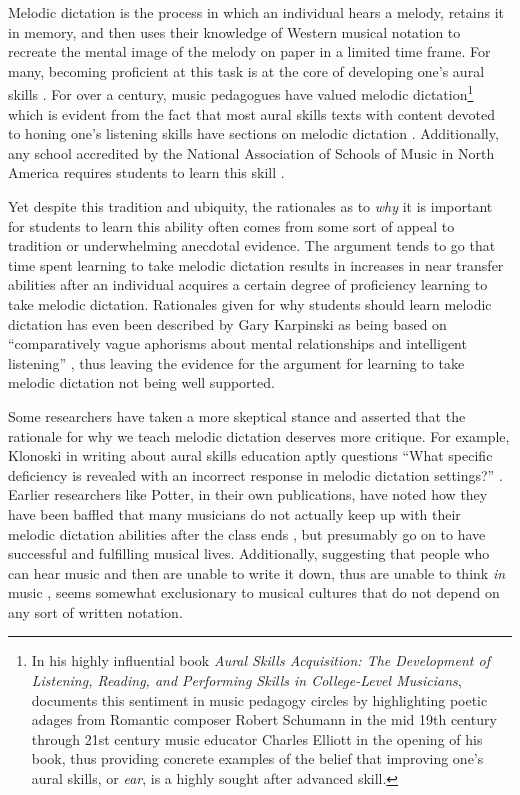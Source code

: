 \documentclass[]{book}
\let\rmarkdownfootnote\footnote%
\def\footnote{\protect\rmarkdownfootnote}
\theoremstyle{definition}
\theoremstyle{definition}
\theoremstyle{definition}
\theoremstyle{remark}
\begin{document}
Melodic dictation is the process in which an individual hears a melody,
retains it in memory, and then uses their knowledge of Western musical
notation to recreate the mental image of the melody on paper in a
limited time frame. For many, becoming proficient at this task is at the
core of developing one's aural skills
\citep{karpinskiModelMusicPerception1990}. For over a century, music
pedagogues have valued melodic dictation\footnote{In his highly
  influential book \emph{Aural Skills Acquisition: The Development of
  Listening, Reading, and Performing Skills in College-Level Musicians},
  \citet{karpinskiAuralSkillsAcquisition2000} documents this sentiment
  in music pedagogy circles by highlighting poetic adages from Romantic
  composer Robert Schumann in the mid 19th century through 21st century
  music educator Charles Elliott in the opening of his book, thus
  providing concrete examples of the belief that improving one's aural
  skills, or \emph{ear}, is a highly sought after advanced skill.} which
is evident from the fact that most aural skills texts with content
devoted to honing one's listening skills have sections on melodic
dictation \citep{karpinskiAuralSkillsAcquisition2000}. Additionally, any
school accredited by the National Association of Schools of Music in
North America requires students to learn this skill \citep[
§VIII.6.B.2.A]{NationalAssociationSchools2018}.

Yet despite this tradition and ubiquity, the rationales as to \emph{why}
it is important for students to learn this ability often comes from some
sort of appeal to tradition or underwhelming anecdotal evidence. The
argument tends to go that time spent learning to take melodic dictation
results in increases in near transfer abilities after an individual
acquires a certain degree of proficiency learning to take melodic
dictation. Rationales given for why students should learn melodic
dictation has even been described by Gary Karpinski as being based on
``comparatively vague aphorisms about mental relationships and
intelligent listening''
\citep[p.192]{karpinskiModelMusicPerception1990}, thus leaving the
evidence for the argument for learning to take melodic dictation not
being well supported.

Some researchers have taken a more skeptical stance and asserted that
the rationale for why we teach melodic dictation deserves more critique.
For example, Klonoski in writing about aural skills education aptly
questions ``What specific deficiency is revealed with an incorrect
response in melodic dictation settings?''
\citep{klonoskiImprovingDictationAuralSkills2006}. Earlier researchers
like Potter, in their own publications, have noted how they have been
baffled that many musicians do not actually keep up with their melodic
dictation abilities after the class ends
\citep{potterIdentifyingSucessfulDictation1990}, but presumably go on to
have successful and fulfilling musical lives. Additionally, suggesting
that people who can hear music and then are unable to write it down,
thus are unable to think \emph{in} music
\citep{karpinskiAuralSkillsAcquisition2000}, seems somewhat exclusionary
to musical cultures that do not depend on any sort of written notation.
\end{document}
